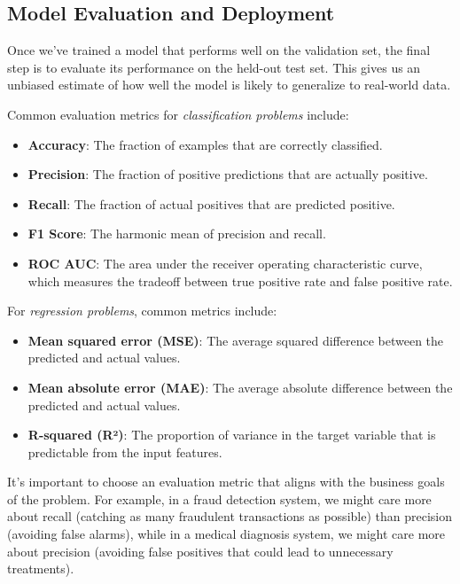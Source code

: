 \documentclass[
  9pt,
  letterpaper,
  abstract,
  titlepage]{scrbook}
\providecommand{\tightlist}{%
  \setlength{\itemsep}{0pt}\setlength{\parskip}{0pt}}\usepackage{longtable,booktabs,array}
\def\tightlist{}
\let\tightlist\relax
\begin{document}
\subsection{Model Evaluation and
Deployment}\label{model-evaluation-and-deployment}

Once we've trained a model that performs well on the validation set, the
final step is to evaluate its performance on the held-out test set. This
gives us an unbiased estimate of how well the model is likely to
generalize to real-world data.

Common evaluation metrics for \emph{classification problems} include:

\begin{itemize}
\tightlist
\item
  \textbf{Accuracy}: The fraction of examples that are correctly
  classified.
\item
  \textbf{Precision}: The fraction of positive predictions that are
  actually positive.
\item
  \textbf{Recall}: The fraction of actual positives that are predicted
  positive.
\item
  \textbf{F1 Score}: The harmonic mean of precision and recall.
\item
  \textbf{ROC AUC}: The area under the receiver operating characteristic
  curve, which measures the tradeoff between true positive rate and
  false positive rate.
\end{itemize}

For \emph{regression problems}, common metrics include:

\begin{itemize}
\tightlist
\item
  \textbf{Mean squared error (MSE)}: The average squared difference
  between the predicted and actual values.
\item
  \textbf{Mean absolute error (MAE)}: The average absolute difference
  between the predicted and actual values.
\item
  \textbf{R-squared (R²)}: The proportion of variance in the target
  variable that is predictable from the input features.
\end{itemize}

It's important to choose an evaluation metric that aligns with the
business goals of the problem. For example, in a fraud detection system,
we might care more about recall (catching as many fraudulent
transactions as possible) than precision (avoiding false alarms), while
in a medical diagnosis system, we might care more about precision
(avoiding false positives that could lead to unnecessary treatments).
\end{document}
